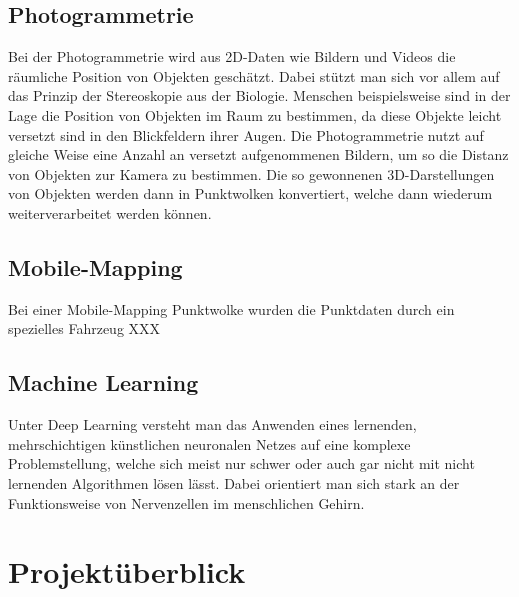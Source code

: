 \subsection{Photogrammetrie}
Bei der Photogrammetrie \cite{Linder-2009} wird aus 2D-Daten wie Bildern und Videos die räumliche Position von Objekten geschätzt. Dabei stützt man sich vor allem auf das Prinzip der Stereoskopie aus der Biologie. Menschen beispielsweise sind in der Lage die Position von Objekten im Raum zu bestimmen, da diese Objekte leicht versetzt sind in den Blickfeldern ihrer Augen. Die Photogrammetrie nutzt auf gleiche Weise eine Anzahl an versetzt aufgenommenen Bildern, um so die Distanz von Objekten zur Kamera zu bestimmen. Die so gewonnenen 3D-Darstellungen von Objekten werden dann in Punktwolken konvertiert, welche dann wiederum weiterverarbeitet werden können.

\subsection{Mobile-Mapping}
Bei einer Mobile-Mapping Punktwolke wurden die Punktdaten durch ein spezielles Fahrzeug XXX 

\subsection{Machine Learning}
Unter Deep Learning versteht man das Anwenden eines lernenden, mehrschichtigen künstlichen neuronalen Netzes auf eine komplexe Problemstellung, welche sich meist nur schwer oder auch gar nicht mit nicht lernenden Algorithmen lösen lässt. Dabei orientiert man sich stark an der Funktionsweise von Nervenzellen im menschlichen Gehirn.

\section{Projektüberblick}

